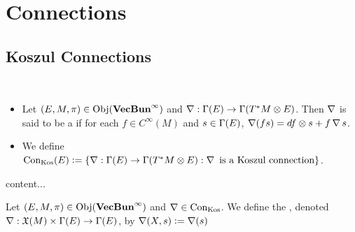 \documentclass{book}
\begin{document}
	
	\newpage
	\chapter{Connections}
	
	\section{Koszul Connections}
	
	\begin{defn}\
		\begin{itemize}
			\item Let $(E, M, \pi) \in \operatorname{Obj}(\operatorname*{\text{\textbf{VecBun}}^{\infty}})$ and $\operatorname{\nabla} : \Gamma(E) \rightarrow \Gamma(T^*M \otimes E)$. Then $\operatorname{\nabla}$ is said to be a  if for each $f \in C^{\infty}(M)$ and $s \in \Gamma(E)$, $\operatorname{\nabla} (fs) = df \otimes s + f \operatorname{\nabla} s$.  
			\item We define $\text{Con}_{\text{Kos}}(E) \vcentcolon= \{\operatorname{\nabla}: \Gamma(E) \rightarrow \Gamma(T^*M \otimes E): \operatorname{\nabla} \text{ is a Koszul connection}\}$.
		\end{itemize}
	\end{defn}

	\begin{ex}
		content...
	\end{ex}

	\begin{defn}
		Let $(E, M, \pi) \in \operatorname{Obj}(\operatorname*{\text{\textbf{VecBun}}^{\infty}})$ and $\operatorname{\nabla} \in \text{Con}_{\text{Kos}}$. We define the , denoted $\operatorname{\nabla}: \mathfrak{X}(M) \times \Gamma(E) \rightarrow \Gamma(E)$, by 
		$\operatorname{\nabla}(X, s) \vcentcolon= \operatorname{\nabla}(s)$
	\end{defn}
	
\end{document}
